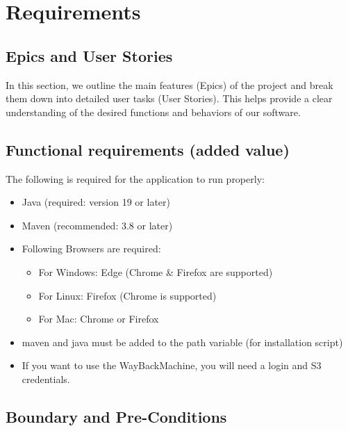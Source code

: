 \section{Requirements}

\subsection{Epics and User Stories}
In this section, we outline the main features (Epics) of the project and break them down into detailed user tasks (User Stories). This helps provide a clear understanding of the desired functions and behaviors of our software.






\subsection{Functional requirements (added value)}
The following is required for the application to run properly: 
\begin{itemize}
    \item Java (required: version 19 or later)
    \item Maven (recommended: 3.8 or later)
    \item Following Browsers are required: 
    \begin{itemize}
        \item For Windows: Edge (Chrome & Firefox are supported)
        \item For Linux: Firefox (Chrome is supported)
        \item For Mac: Chrome or Firefox
    \end{itemize}
    \item maven and java must be added to the path variable (for installation script)
    \item If you want to use the WayBackMachine, you will need a login and S3 credentials.
\end{itemize}

\subsection{Boundary and Pre-Conditions}


